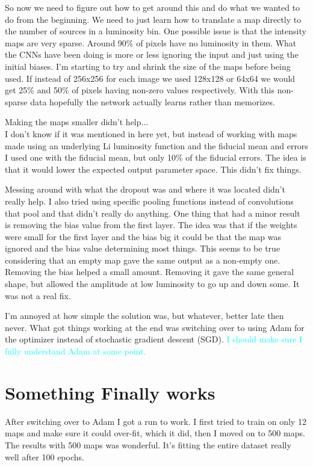 \documentclass{article}
\newcommand{\dnp}[1]{\textcolor{cyan}{#1}}
\begin{document}
		So now we need to figure out how to get around this and do what we wanted to do from the beginning.  We need to just learn how to translate a map directly to the number of sources in a luminosity bin.  One possible issue is that the intensity maps are very sparse.  Around 90\% of pixels have no luminosity in them.  What the CNNs have been doing is more or less ignoring the input and just using the initial biases.  I'm starting to try and shrink the size of the maps before being used.  If instead of 256x256 for each image we used 128x128 or 64x64 we would get 25\% and 50\% of pixels having non-zero values respectively.  With this non-sparse data hopefully the network actually learns rather than memorizes.

		Making the maps smaller didn't help... \\

		I don't know if it was mentioned in here yet, but instead of working with maps made using an underlying Li luminosity function and the fiducial mean and errors I used one with the fiducial mean, but only 10\% of the fiducial errors.  The idea is that it would lower the expected output parameter space.  This didn't fix things.

		Messing around with what the dropout was and where it was located didn't really help.  I also tried using specific pooling functions instead of convolutions that pool and that didn't really do anything.  One thing that had a minor result is removing the bias value from the first layer.  The idea was that if the weights were small for the first layer and the bias big it could be that the map was ignored and the bias value determining most things.  This seems to be true considering that an empty map gave the same output as a non-empty one.  Removing the bias helped a small amount.  Removing it gave the same general shape, but allowed the amplitude at low luminosity to go up and down some.  It was not a real fix.

		I'm annoyed at how simple the solution was, but whatever, better late then never.  What got things working at the end was switching over to using Adam for the optimizer instead of stochastic gradient descent (SGD).  \dnp{I should make sure I fully understand Adam at some point.}

	\section{Something Finally works} \label{sec:works}
		After switching over to Adam I got a run to work.  I first tried to train on only 12 maps and make sure it could over-fit, which it did, then I moved on to 500 maps.  The results with 500 maps was wonderful.  It's fitting the entire dataset really well after 100 epochs.
\end{document}
